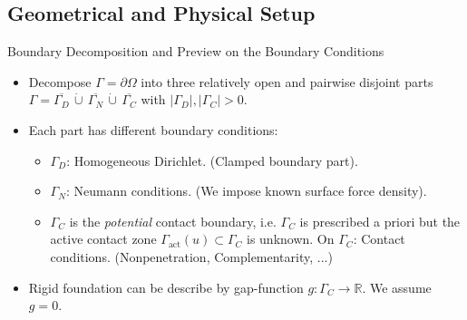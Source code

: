 \documentclass[10pt,aspectratio=169]{beamer}
\def\R{{\mathbb R}}
\begin{document}
\subsection{Geometrical and Physical Setup}

\begin{frame}{Boundary Decomposition and Preview on the Boundary Conditions}
	\begin{itemize}
		\item Decompose $\Gamma = \partial\Omega$ into three relatively open and pairwise disjoint parts $\Gamma = \overline{\Gamma_D}\,\mathbin{\dot\cup}\,\overline{\Gamma_N}\,\mathbin{\dot\cup}\,\overline{\Gamma_C}$ with $|\Gamma_D|,|\Gamma_C|>0$.
		\item Each part has different boundary conditions:
		      \begin{itemize}
			      \item $\Gamma_D$: Homogeneous Dirichlet. (Clamped boundary part).
			      \item $\Gamma_N$: Neumann conditions. (We impose known surface force density).
			      \item $\Gamma_C$ is the {\em potential} contact boundary, i.e. $\Gamma_C$ is prescribed a priori but the active contact zone $\Gamma_{\mathrm{act}}(u)\subset\Gamma_C$ is unknown. On $\Gamma_C$: Contact conditions. (Nonpenetration, Complementarity, ...)
		      \end{itemize}
		\item Rigid foundation can be describe by gap-function $g:\Gamma_C\to\R$. We assume $g = 0$.
	\end{itemize}
	\begin{figure}[!h]
		\centering
		
	\end{figure}
\end{frame}
\end{document}
